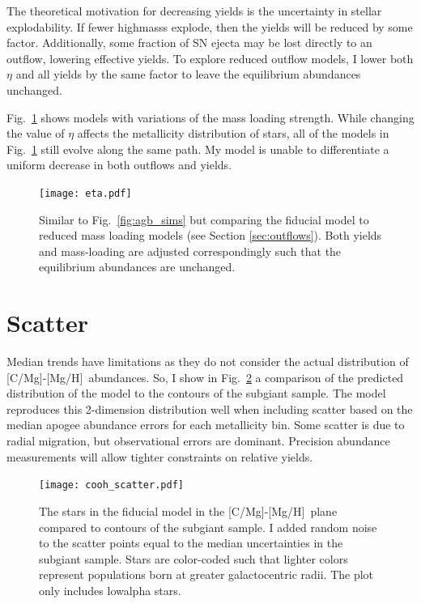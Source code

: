 \documentclass[12pt,oneside,letterpaper]{report}
\newcommand{\apogee}{\gls{apogee}}
\newcommand{\caah}{[C/Mg]-[Mg/H]}
\begin{document}
The theoretical motivation for decreasing yields is the uncertainty in stellar explodability.
If fewer \glspl{highmass} explode, then the yields will be reduced by some factor. Additionally, some fraction of SN ejecta may be lost directly to an outflow, lowering effective yields. To explore reduced outflow models, I lower both $\eta$ and all yields by the same factor to leave the equilibrium abundances unchanged. 

Fig.~\ref{fig:eta} shows models with variations of the mass loading strength. While changing the value of $\eta$ affects the metallicity distribution of stars, all of the models in Fig.~\ref{fig:eta} still evolve along the same path. My model is unable to differentiate a uniform decrease in both outflows and yields.

\begin{figure}[htp]
    \centering
    \texttt{[image: eta.pdf]}
    \caption[Reduced-Outflow Models]{Similar to Fig.~\ref{fig:agb_sims} but comparing the fiducial model to reduced mass loading models (see Section  \ref{sec:outflows}). Both yields and mass-loading are adjusted correspondingly such that the equilibrium abundances are unchanged. }
    \label{fig:eta}
\end{figure}


\section{Scatter}

Median trends have limitations as they do not consider the actual distribution of \caah~abundances. So, I show in Fig.~\ref{fig:scatter} a comparison of the predicted distribution of the model to the contours of the \gls{subgiant} sample. The model reproduces this 2-dimension distribution well when including scatter based on the median \apogee{} abundance errors for each metallicity bin. Some scatter is due to radial migration, but observational errors are dominant. Precision abundance measurements will allow tighter constraints on relative yields. 

\begin{figure}[htp]
    \centering
    \texttt{[image: cooh\_scatter.pdf]}
    \caption[Scatter Agreement]{The stars in the fiducial model in the \caah~plane compared to contours of the \gls{subgiant} sample. I added random noise to the scatter points equal to the median uncertainties in the \gls{subgiant} sample. Stars are color-coded such that lighter colors represent populations born at greater galactocentric radii. The plot only includes \gls{lowalpha} stars.
    }
    \label{fig:scatter}
\end{figure}
\end{document}

